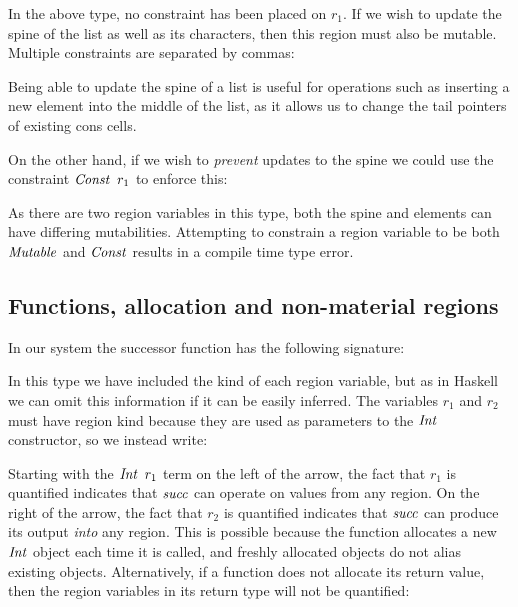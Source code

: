 In the above type, no constraint has been placed on $r_1$. If we wish to update the spine of the list as well as its characters, then this region must also be mutable. Multiple constraints are separated by commas:


Being able to update the spine of a list is useful for operations such as inserting a new element into the middle of the list, as it allows us to change the tail pointers of existing cons cells.

On the other hand, if we wish to \emph{prevent} updates to the spine we could use the constraint $\iConst \ r_1$ to enforce this:


As there are two region variables in this type, both the spine and elements can have differing mutabilities. Attempting to constrain a region variable to be both $\operatorname{\mathit{Mutable}}$ and $\operatorname{\mathit{Const}}$ results in a compile time type error. 


\subsection{Functions, allocation and non-material regions}
\label{System:Regions:non-material}
In our system the successor function has the following signature:



In this type we have included the kind of each region variable, but as in Haskell we can omit this information if it can be easily inferred. The variables $r_1$ and $r_2$ must have region kind because they are used as parameters to the $\operatorname{\mathit{Int}}$ constructor, so we instead write:


Starting with the $\operatorname{\mathit{Int}} \ r_1$ term on the left of the arrow, the fact that $r_1$ is quantified indicates that $\operatorname{\mathit{succ}}$ can operate on values from any region. On the right of the arrow, the fact that $r_2$ is quantified indicates that $\operatorname{\mathit{succ}}$ can produce its output \emph{into} any region. This is possible because the function allocates a new $\operatorname{\mathit{Int}}$ object each time it is called, and freshly allocated objects do not alias existing objects. Alternatively, if a function does not allocate its return value, then the region variables in its return type will not be quantified:

